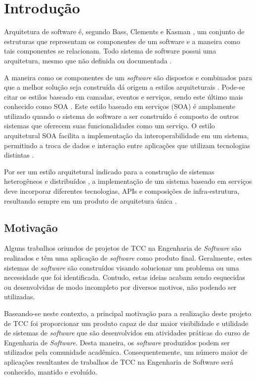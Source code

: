 \chapter[Introdução]{Introdução}
Arquitetura de software é, segundo Bass, Clements e Kasman \cite{bass_software_archi_practice_2003}, um conjunto de estruturas que representam os componentes de um software e a maneira como tais componentes se relacionam. Todo sistema de software possui uma arquitetura, mesmo que não definida ou documentada \cite{bass_software_archi_practice_2003}.

A maneira como os componentes de um \textit{software} são dispostos e combinados para que a melhor solução seja construída dá origem a estilos arquiteturais \cite{pressman2006engenharia}. Pode-se citar os estilos baseado em camadas, eventos e serviços, sendo este último mais conhecido como SOA \cite{josuttis_soa_2007}. Este estilo baseado em serviços (SOA) é amplamente utilizado quando o sistema de software a ser construído é composto de outros sistemas que oferecem suas funcionalidades como um serviço. O estilo arquitetural SOA facilita a implementação da interoperabilidade em um sistema, permitindo a troca de dados e interação entre aplicações que utilizam tecnologias distintas \cite{oqueesoa_2010}.

Por ser um estilo arquitetural indicado para a construção de sistemas heterogêneos e distribuídos \cite{josuttis_soa_2007}, a implementação de um sistema baseado em serviços deve incorporar diferentes tecnologias, APIs e composições de infra-estrutura, resultando sempre em um produto de arquitetura única \cite{erl_orientacaoaservico_2009}.

\section{Motivação}
Alguns trabalhos oriundos de projetos de TCC na Engenharia de \textit{Software} são realizados e têm uma aplicação de \textit{software} como produto final. Geralmente, estes sistemas de \textit{software} são construídos visando solucionar um problema ou uma necessidade que foi identificada. Contudo, estas ideias acabam sendo esquecidas ou desenvolvidas de modo incompleto por diversos motivos, não podendo ser utilizadas.

Baseando-se neste contexto, a principal motivação para a realização deste projeto de TCC foi proporcionar um produto capaz de dar maior visibilidade e utilidade de sistemas de \textit{software} que são desenvolvidos em atividades práticas do curso de Engenharia de \textit{Software}. Desta maneira, os \textit{software} produzidos podem ser utilizados pela comunidade acadêmica. Consequentemente, um número maior de aplicações resultantes de trabalhos de TCC na Engenharia de Software será conhecido, mantido e evoluído. 

